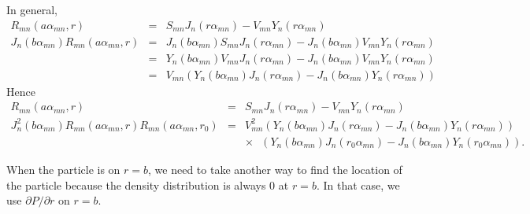 \documentclass{article}
\begin{document}
%
In general,
%
\begin{eqnarray}
    R_{mn}(a\alpha_{mn}, r) &=& S_{mn}J_n(r\alpha_{mn}) - V_{mn}Y_n(r\alpha_{mn})
\nonumber\\
    J_n(b\alpha_{mn})R_{mn}(a\alpha_{mn}, r)
    &=& J_n(b\alpha_{mn})S_{mn}J_n(r\alpha_{mn}) - J_n(b\alpha_{mn})V_{mn}Y_n(r\alpha_{mn})
\nonumber\\
    &=& Y_n(b\alpha_{mn})V_{mn}J_n(r\alpha_{mn}) - J_n(b\alpha_{mn})V_{mn}Y_n(r\alpha_{mn})
\nonumber\\
    &=& V_{mn}\left(Y_n(b\alpha_{mn})J_n(r\alpha_{mn}) - J_n(b\alpha_{mn})Y_n(r\alpha_{mn})\right)
\nonumber
\end{eqnarray}
%
Hence
%
\begin{eqnarray}
    R_{mn}(a\alpha_{mn}, r) &=& S_{mn}J_n(r\alpha_{mn}) - V_{mn}Y_n(r\alpha_{mn})
\nonumber\\
    J_n^2(b\alpha_{mn})R_{mn}(a\alpha_{mn}, r)R_{mn}(a\alpha_{mn}, r_0)
    &=& V_{mn}^2
        \left(Y_n(b\alpha_{mn})J_n(r  \alpha_{mn}) - J_n(b\alpha_{mn})Y_n(r  \alpha_{mn})\right)
\nonumber\\
    & & \times\ \ \ \left(Y_n(b\alpha_{mn})J_n(r_0\alpha_{mn}) - J_n(b\alpha_{mn})Y_n(r_0\alpha_{mn})\right).
\nonumber
\end{eqnarray}

When the particle is on $r=b$, we need to take another way to find the location
of the particle because the density distribution is always 0 at $r=b$.
In that case, we use $\partial P / \partial r$ on $r=b$.
\end{document}
